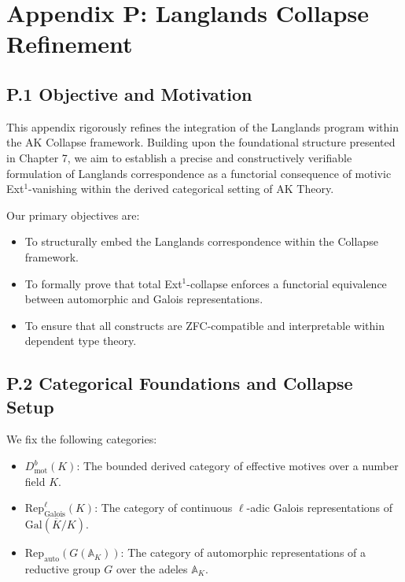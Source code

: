 \documentclass[11pt]{article}
\begin{document}
\section*{Appendix P: Langlands Collapse Refinement}

\subsection*{P.1 Objective and Motivation}

This appendix rigorously refines the integration of the Langlands program within the AK Collapse framework. Building upon the foundational structure presented in Chapter 7, we aim to establish a precise and constructively verifiable formulation of Langlands correspondence as a functorial consequence of motivic Ext$^1$-vanishing within the derived categorical setting of AK Theory.

Our primary objectives are:
\begin{itemize}
  \item To structurally embed the Langlands correspondence within the Collapse framework.
  \item To formally prove that total Ext$^1$-collapse enforces a functorial equivalence between automorphic and Galois representations.
  \item To ensure that all constructs are ZFC-compatible and interpretable within dependent type theory.
\end{itemize}

\subsection*{P.2 Categorical Foundations and Collapse Setup}

We fix the following categories:
\begin{itemize}
  \item $D^b_{\mathrm{mot}}(K)$: The bounded derived category of effective motives over a number field $K$.
  \item $\mathrm{Rep}^\ell_{\mathrm{Galois}}(K)$: The category of continuous $\ell$-adic Galois representations of $\mathrm{Gal}(\overline{K}/K)$.
  \item $\mathrm{Rep}_{\mathrm{auto}}(G(\mathbb{A}_K))$: The category of automorphic representations of a reductive group $G$ over the adeles $\mathbb{A}_K$.
\end{itemize}
\end{document}

